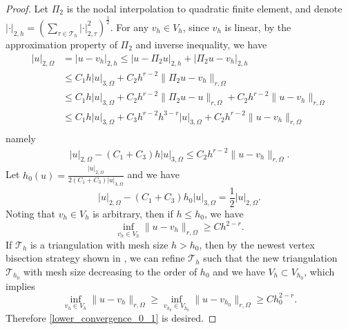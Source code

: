 \begin{proof}
Let $\Pi_2$ is the nodal interpolation to quadratic finite element,  and denote $\displaystyle |\cdot|_{2,h}=
\left(\sum_{\tau \in \mathcal T_h} |\cdot|^2_{2,\tau}\right)^{\frac12}$. For any $v_h\in V_h$, since $v_h$ is
linear, by the approximation property of $\Pi_2$ and inverse inequality, we have 
\begin{equation}
\begin{aligned}
|u|_{2,\Omega}&=|u-v_h|_{2,h}\le |u-\Pi_2 u|_{2,h}+|\Pi_2u-v_h|_{2,h}\\
& \le C_1h |u|_{3,\Omega}+C_2h^{r-2}\|\Pi_2u-v_h\|_{r,\Omega}\\
& \le C_1h |u|_{3,\Omega}+C_2h^{r-2}\|\Pi_2u-u\|_{r,\Omega} +C_2h^{r-2}\|u-v_h\|_{r,\Omega}\\
& \le C_1h |u|_{3,\Omega}+C_3h^{r-2}h^{3-r}|u|_{3,\Omega} +C_2h^{r-2}\|u-v_h\|_{r,\Omega}\\
\end{aligned}
\end{equation}
namely 
\begin{equation}
\begin{aligned}
|u|_{2,\Omega}-(C_1+C_3)h|u|_{3,\Omega}\le C_2h^{r-2}\|u-v_h\|_{r,\Omega}.
\end{aligned}
\end{equation}
Let $h_0(u)=\frac{|u|_{2,\Omega}}{2 (C_1+C_3)|u|_{3,\Omega}}$ and we have
$$
|u|_{2,\Omega}-(C_1+C_3)h_0|u|_{3,\Omega}=\frac12|u|_{2,\Omega}.
$$
Noting that $v_h\in V_h$ is arbitrary, then if $h\le h_0$, we have  
\begin{equation}
\inf_{v_h\in V_h}\|u-v_h\|_{r,\Omega}\geq Ch^{2-r}.
\end{equation}
If $\mathcal{T}_h$ is a triangulation with mesh size $h> h_0$, then by the newest vertex bisection strategy shown in \cite{stevenson2008completion}, we 
can refine $\mathcal{T}_h$ such that the new triangulation 
$\mathcal{T}_{h_0}$ with mesh 
size decreasing to the order of $h_0$  and we have $V_h\subset V_{h_0}$, which implies 
\begin{equation}
\inf_{v_h\in V_h}\|u-v_h\|_{r,\Omega}\geq \inf_{v_{h_0}\in V_{h_0}}\|u-v_{h_0}\|_{r,\Omega} \geq Ch_0^{2-r}.
\end{equation}
Therefore \eqref{lower_convergence_0_1} is desired. 
\end{proof}

